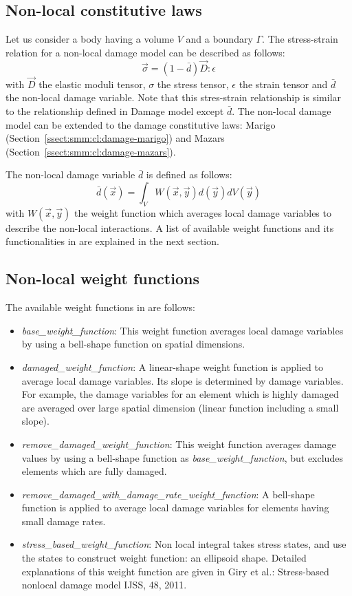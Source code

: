 \subsection{Non-local constitutive laws}
Let us consider a body having a volume $V$ and a boundary $\Gamma$. The stress-strain relation for a non-local damage model can be described as follows:
\begin{equation}
  \label{eq:non-local-const}
  \vec{\sigma} = (1-\bar{d}) \vec{D}:\epsilon
\end{equation}
with $\vec{D}$ the elastic moduli tensor, $\sigma$ the stress tensor, $\epsilon$ the strain tensor and $\bar{d}$ the non-local damage variable. Note that this stres-strain relationship is similar to the relationship defined in Damage model except $\bar{d}$. The non-local damage model can be extended to the damage constitutive laws: Marigo (Section~\ref{ssect:smm:cl:damage-marigo}) and Mazars (Section~\ref{ssect:smm:cl:damage-mazars}).

The non-local damage variable $\bar{d}$ is defined as follows:
\begin{equation}
  \label{eq:non-local-const}
  \bar{d}(\vec{x}) = \int_{V}W(\vec{x}, \vec{y}) d(\vec{y}) dV(\vec{y})
\end{equation}
with $W(\vec{x},\vec{y})$ the weight function which averages local damage variables to describe the non-local interactions. A list of available weight functions and its functionalities in \akantu are explained in the next section.

\subsection{Non-local weight functions}
The available weight functions in \akantu are follows:
\begin{itemize}  
\item \emph{base\_weight\_function}: This weight function averages local damage variables by using a bell-shape function on spatial dimensions.
\item \emph{damaged\_weight\_function}: A linear-shape weight function is applied to average local damage variables. Its slope is determined by damage variables. For example, the damage variables for an element which is highly damaged are averaged over large spatial dimension (linear function including a small slope).
\item \emph{remove\_damaged\_weight\_function}: This weight function averages damage values by using a bell-shape function as \emph{base\_weight\_function}, but excludes elements which are fully damaged.
\item \emph{remove\_damaged\_with\_damage\_rate\_weight\_function}: A bell-shape function is applied to average local damage variables for elements having small damage rates.
\item \emph{stress\_based\_weight\_function}: Non local integral takes stress states, and use the states to construct weight function: an ellipsoid shape. Detailed explanations of this weight function are given in Giry et al.: Stress-based nonlocal damage model IJSS, 48, 2011.
\end{itemize}  


